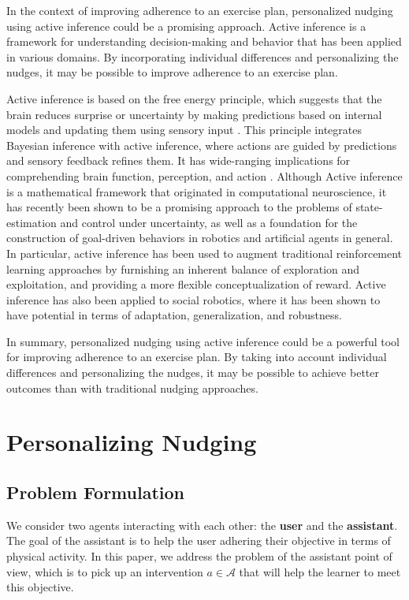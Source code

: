 \documentclass[manuscript,screen,review]{acmart}
\begin{document}
In the context of improving adherence to an exercise plan, personalized nudging using active inference could be a promising approach. Active inference is a framework for understanding decision-making and behavior that has been applied in various domains. By incorporating individual differences and personalizing the nudges, it may be possible to improve adherence to an exercise plan.

Active inference is based on the free energy principle, which suggests that the brain reduces surprise or uncertainty
 by making predictions based on internal models and updating them using sensory input \cite{mann2022free}. This
 principle integrates  Bayesian inference with active inference, where actions are guided by predictions and sensory feedback refines them.
  It has wide-ranging implications for comprehending brain function, perception, and action
  \cite{bruineberg2018anticipating}. Although Active inference is a mathematical framework that originated in
  computational neuroscience, it has recently been shown to be a promising approach to the problems of
  state-estimation and control under uncertainty, as well as a foundation for the construction of goal-driven
  behaviors in robotics and artificial agents in general\cite{lanillos2021active}. In particular, active inference
  has been used to augment traditional reinforcement learning approaches by furnishing an inherent balance of
  exploration and exploitation, and providing a more flexible conceptualization of
  reward\cite{tschantz2020reinforcement}. Active inference has also been applied to social robotics, where it has
  been shown to have potential in terms of adaptation, generalization, and robustness\cite{da2022active}.

In summary, personalized nudging using active inference could be a powerful tool for improving adherence to an exercise plan. By taking into account individual differences and personalizing the nudges, it may be possible to achieve better outcomes than with traditional nudging approaches.


\section{Personalizing Nudging}

\subsection{Problem Formulation}

We consider two agents interacting with each other: the \textbf{user} and the \textbf{assistant}.
The goal of the assistant is to help the user adhering their objective in terms of physical activity. In this paper, we
 address the problem of the assistant point of view, which is to pick up an intervention $a \in \mathcal{A}$ that will
 help the learner to meet this objective.
\end{document}
